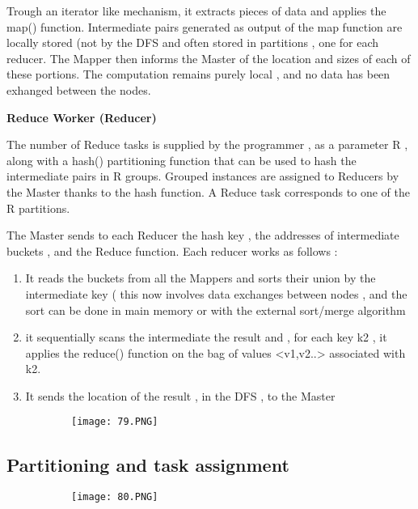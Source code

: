 \documentclass{article}
\begin{document}
Trough an iterator like mechanism, it extracts pieces of data and applies the map() function.
Intermediate pairs generated as output of the map function are locally stored (not by the DFS and often stored in partitions , one for each reducer.
The Mapper then informs the Master of the location and sizes of each of these portions.
The computation remains purely local , and no data has been exhanged between the nodes.

\vspace{3mm}
\textbf{Reduce Worker (Reducer)}

The number of Reduce tasks is supplied by the programmer , as a parameter R , along with a hash() partitioning function that can be used to hash the intermediate pairs in R groups.
Grouped instances are assigned to Reducers by the Master thanks to the hash function.
A Reduce task corresponds to one of the R partitions.


The Master sends to each Reducer the hash key , the addresses of intermediate buckets , and the Reduce function.
Each reducer works as follows : 
\begin{enumerate}
    \item It reads the buckets from all the Mappers and sorts their union by the intermediate key ( this now involves data exchanges between nodes , and the sort can be done in main memory or with the external sort/merge algorithm
    \item it sequentially scans the intermediate the result and , for each key k2 , it applies the reduce() function on the bag of values <v1,v2..> associated with k2.
    \item It sends the location of the result , in the DFS , to the Master
\end{enumerate}


\begin{figure}[ht!]
  \centering
  \begin{subfigure}[b]{0.5\linewidth}
    \texttt{[image: 79.PNG]}
  \end{subfigure}
\end{figure}

\subsection{Partitioning and task assignment}


\begin{figure}[ht!]
  \centering
  \begin{subfigure}[b]{0.5\linewidth}
    \texttt{[image: 80.PNG]}
  \end{subfigure}
\end{figure}
\end{document}
